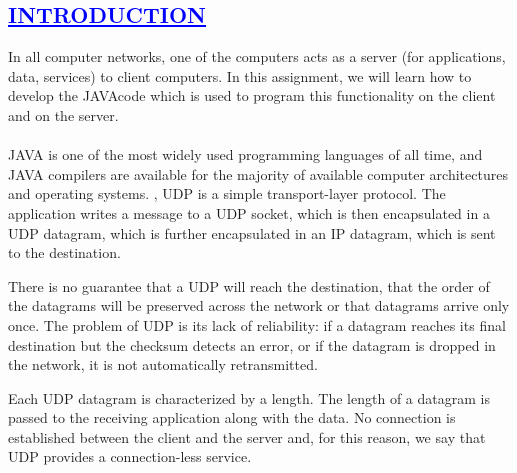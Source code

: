 \documentclass[a4paper,12pt]{report}
\begin{document}
\begin{center}
\chapter{\textcolor{blue}{\underline {INTRODUCTION}}}
\end{center}
\noindent  In all computer networks, one of the computers acts as a server (for applications, data, services)
to client computers. In this assignment, we will learn how to develop the JAVAcode which is
used to program this functionality on the client and on the server.\\\\
	  JAVA is one of the most widely used programming languages of all time, and JAVA compilers are available for the majority of available computer architectures and operating systems.
, 
UDP is a simple transport-layer protocol. The application writes a message to a UDP socket, which is then encapsulated in a UDP datagram, which is further encapsulated in an IP datagram, which is sent to the destination.

There is no guarantee that a UDP will reach the destination, that the order of the datagrams will be preserved across the network or that datagrams arrive only once.
The problem of UDP is its lack of reliability: if a datagram reaches its final destination but the checksum detects an error, or if the datagram is dropped in the network, it is not automatically retransmitted.

Each UDP datagram is characterized by a length. The length of a datagram is passed to the receiving application along with the data.
No connection is established between the client and the server and, for this reason, we say that UDP provides a connection-less service. 
	
\end{document}
